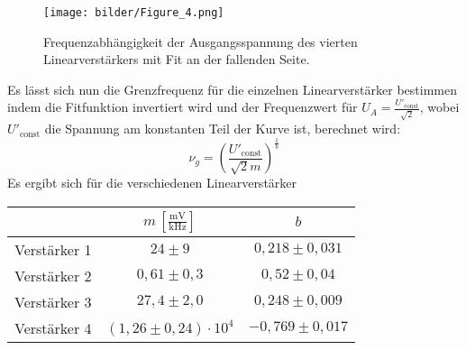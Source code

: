 \begin{figure}[h]
  \centering
  \texttt{[image: bilder/Figure\_4.png]}
  \caption{Frequenzabhängigkeit der Ausgangsspannung des vierten Linearverstärkers mit Fit an der fallenden Seite.}
  \label{Aufbau}
\end{figure}
Es lässt sich nun die Grenzfrequenz für die einzelnen Linearverstärker bestimmen indem die Fitfunktion invertiert wird und der Frequenzwert für $U_A=\frac{U'_\text{const}}{\sqrt{2}}$, wobei $U'_\text{const}$ die Spannung am konstanten Teil der Kurve ist, berechnet wird:
\begin{equation}
  \nu_g=\left(\frac{U'_\text{const}}{\sqrt{2}m}\right)^{\frac{1}{b}}
\end{equation}
Es ergibt sich für die verschiedenen Linearverstärker
\begin{table}[H]
\centering
\begin{tabular}{c|cc}
&$m\,[\frac{\si{\mV}}{\si{\kHz}}]$&$b$\\
\hline
Verstärker 1 & $24\pm 9$ & $0{,}218\pm 0{,}031$\\
Verstärker 2 & $0{,}61\pm0{,}3$ & $0{,}52\pm0{,}04$   \\
Verstärker 3 & $27{,}4\pm2{,}0$ & $0{,}248\pm0{,}009$   \\
Verstärker 4 & $(1{,}26\pm0{,}24)\cdot10^4$ & $-0{,}769\pm0{,}017$   \\
\end{tabular}
\label{Tab_3}
\end{table}
